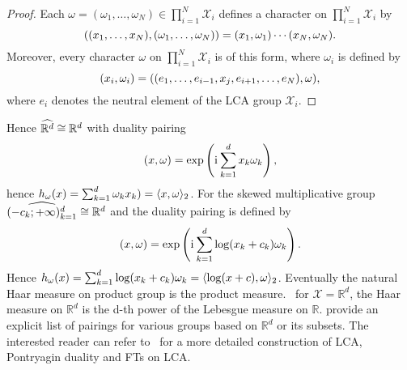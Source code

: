 \begin{proof}
Each $\omega=(\omega_1, \hdots, \omega_N)\in\prod_{i=1}^N\mathcal{X}_i$ defines a character on $\prod_{i=1}^N\mathcal{X}_i$ by
\begin{dmath*}
\pairing{(x_1, \hdots, x_N),(\omega_1, \hdots, \omega_N)}=\pairing{x_1,\omega_1}\cdots\pairing{x_N,\omega_N}.
\end{dmath*}
Moreover, every character $\omega$ on $\prod_{i=1}^N\mathcal{X}_i$ is of this form, where $\omega_i$ is defined by
\begin{dmath*}
\pairing{x_i,\omega_i}=\pairing{(e_1, \hdots, e_{i-1}, x_j, e_{i+1}, \hdots, e_N), \omega},
\end{dmath*}
where $e_i$ denotes the neutral element of the \acs{LCA} group $\mathcal{X}_i$.
\end{proof}
Hence $\widehat{\mathbb{R}^d}\cong\mathbb{R}^d$ with duality pairing
\begin{dmath*}
\pairing{x,\omega}=\exp\left(\iu\sum_{k=1}^d x_k\omega_k \right),
\end{dmath*} hence $h_\omega(x)=\sum_{k=1}^d\omega_k x_k)=\langle x,\omega\rangle_2$. For the skewed multiplicative group $\widehat{(-c_k;+\infty)_{k=1}^d}\cong\mathbb{R}^d$ and the duality pairing is defined by
\begin{dmath*}
\label{eq:pairing-skewed}
\pairing{x, \omega} = \exp\left(\iu\sum_{k=1}^d\log(x_k+c_k)\omega_k\right).
\end{dmath*}
Hence $h_\omega(x)=\sum_{k=1}^d \log(x_k+c_k)\omega_k=\langle\log(x+c),\omega\rangle_2$. Eventually the natural Haar measure on product group is the product measure. \Eg~for $\mathcal{X}=\mathbb{R}^d$, the Haar measure on $\mathbb{R}^d$ is the d-th power of the Lebesgue measure on $\mathbb{R}$.  provide an explicit list of pairings for various groups based on $\mathbb{R}^d$ or its subsets. The interested reader can refer to~\citet{folland1994course} for a more detailed construction of LCA, Pontryagin duality and \acl{FT}s on LCA.

